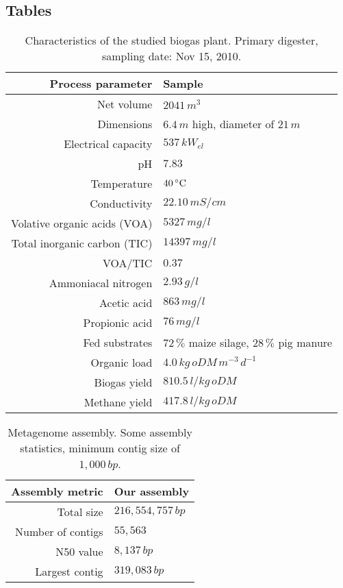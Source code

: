 \documentclass{bmcart}
\begin{document}
\begin{backmatter}
\section*{Tables}
\begin{table}[h!]
\caption{Characteristics of the studied biogas plant. Primary digester, sampling date: Nov 15, 2010.}
\begin{tabular}{rl}
\hline
Process parameter & Sample\\
\hline
Net volume & $2041\,m^{3}$\\
Dimensions & $6.4\,m$ high, diameter of $21\,m$\\
Electrical capacity & $537\,kW_{el}$\\
\hline
pH & $7.83$\\
Temperature & $40\,^{\circ}{\rm C}$\\
Conductivity & $22.10\,mS/cm$\\
Volative organic acids (VOA) & $5327\,mg/l$\\
Total inorganic carbon (TIC) & $14397\,mg/l$\\
VOA/TIC & $0.37$\\
Ammoniacal nitrogen & $2.93\,g/l$\\
Acetic acid & $863\,mg/l$\\
Propionic acid & $76\,mg/l$\\
\hline
Fed substrates & $72\,\%$ maize silage, $28\,\%$ pig manure\\
Organic load & $4.0\,kg\,oDM\,m^{-3}\,d^{-1}$\\
Biogas yield & $810.5\,l/kg\,oDM$\\
Methane yield & $417.8\,l/kg\,oDM$\\
\hline
\end{tabular}
\label{tBiogasPlant}
\end{table}

\begin{table}[h!]
\caption{Metagenome assembly. Some assembly statistics, minimum contig size of $1,000\,bp$.}
\begin{tabular}{rl}
\hline
Assembly metric & Our assembly\\
\hline
Total size & $216,554,757\,bp$\\
Number of contigs & $55,563$\\
N50 value & $8,137\,bp$\\
Largest contig & $319,083\,bp$\\
\hline
\end{tabular}
\label{tAssembly}
\end{table}


\end{backmatter}
\end{document}
